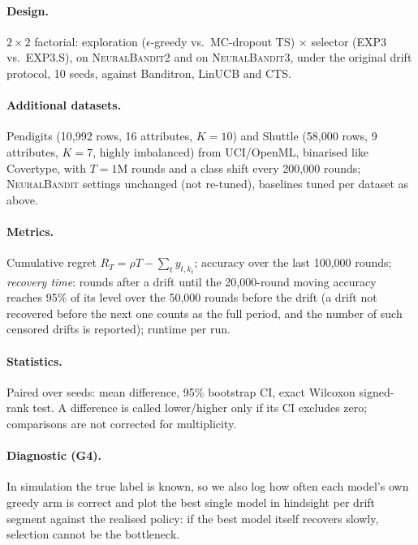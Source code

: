 \documentclass[sigconf]{acmart}
\newcommand{\NB}{\textsc{NeuralBandit}}
\begin{document}
\paragraph{Design.} $2\times2$ factorial: exploration ($\epsilon$-greedy vs.\ MC-dropout TS) $\times$ selector (EXP3
vs.\ EXP3.S), on \NB{}2 and on \NB{}3, under the original drift protocol, 10 seeds, against Banditron, LinUCB and CTS.
\paragraph{Additional datasets.} Pendigits (10{,}992 rows, 16 attributes, $K=10$) and Shuttle (58{,}000 rows,
9 attributes, $K=7$, highly imbalanced) from UCI/OpenML, binarised like Covertype, with
$T=1$M rounds and a class shift every 200{,}000 rounds; \NB{} settings unchanged (not re-tuned), baselines tuned per
dataset as above.
\paragraph{Metrics.} Cumulative regret $R_T=\rho T-\sum_t y_{t,k_t}$; accuracy over the last 100{,}000 rounds;
\emph{recovery time}: rounds after a drift until the 20{,}000-round moving accuracy reaches 95\% of its level over the
50{,}000 rounds before the drift (a drift not recovered before the next one counts as the full period, and the number
of such censored drifts is reported); runtime per run.
\paragraph{Statistics.} Paired over seeds: mean difference, 95\% bootstrap CI, exact Wilcoxon signed-rank test.
A difference is called lower/higher only if its CI excludes zero; comparisons are not corrected for multiplicity.
\paragraph{Diagnostic (G4).} In simulation the true label is known, so we also log how often each model's own greedy
arm is correct and plot the best single model in hindsight per drift segment against the realised policy: if the
best model itself recovers slowly, selection cannot be the bottleneck.
\end{document}
